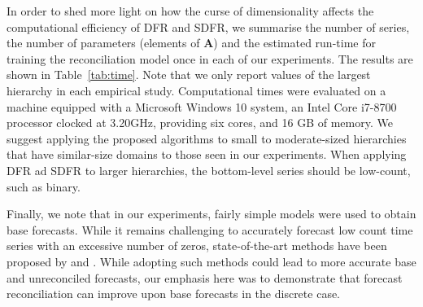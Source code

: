 \documentclass[a4paper,review,12pt,authoryear]{elsarticle}
\theoremstyle{definition}
\begin{document}
    
     In order to shed more light on how the curse of dimensionality affects the computational efficiency of DFR and SDFR, we summarise the number of series, the number of parameters (elements of $\mathbf{A}$) and the estimated run-time for training the reconciliation model once in each of our experiments. 
     The results are shown in Table~\ref{tab:time}. 
     Note that we only report values of the largest hierarchy in each empirical study. 
     Computational times were evaluated on a machine equipped with a Microsoft Windows 10 system, an Intel Core i7-8700 processor clocked at 3.20GHz, providing six cores, and 16 GB of memory. We suggest applying the proposed algorithms to small to moderate-sized hierarchies that have similar-size domains to those seen in our experiments. When applying DFR ad SDFR to larger hierarchies, the bottom-level series should be low-count, such as binary. 

     \begin{table}
       \centering
       \caption{\label{tab:time} Reconciliation model size and computational time (in seconds) in the four experiments implemented in different sections.}
     \end{table}

     Finally, we note that in our experiments, fairly simple models were used to obtain base forecasts. While it remains challenging to accurately forecast low count time series with an excessive number of zeros, state-of-the-art methods have been proposed by \cite{berryBayesianForecastingMany2020a} and \cite{weissEfficientAccountingEstimation2022}. While adopting such methods could lead to more accurate base and unreconciled forecasts, our emphasis here was to demonstrate that forecast reconciliation can improve upon base forecasts in the discrete case.
\end{document}

